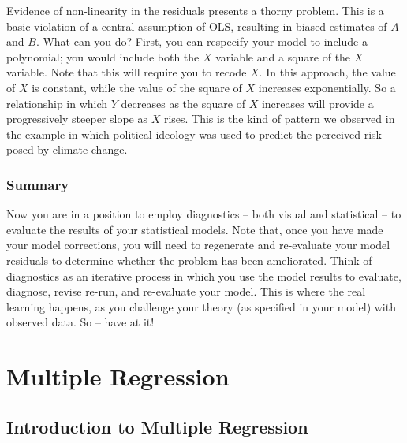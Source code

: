 \documentclass[11pt,openany]{book}\usepackage[]{graphicx}\usepackage[]{color}
\begin{document}
Evidence of non-linearity in the residuals presents a thorny problem. This is a basic violation of a central assumption of OLS, resulting in biased estimates of $A$ and $B$. What can you do? First, you can respecify your model to include a polynomial; you would include both the $X$ variable and a square of the $X$ variable. Note that this will require you to recode $X$. In this approach, the value of $X$ is constant, while the value of the square of $X$ increases exponentially. So a relationship in which $Y$ decreases as the square of $X$ increases will provide a progressively steeper slope as $X$ rises. This is the kind of pattern we observed in the example in which political ideology was used to predict the perceived risk posed by climate change.

\section{Summary} 

Now you are in a position to employ diagnostics -- both visual and statistical -- to evaluate the results of your statistical models. Note that, once you have made your model corrections, you will need to regenerate and re-evaluate your model residuals to determine whether the problem has been ameliorated. Think of diagnostics as an iterative process in which you use the model results to evaluate, diagnose, revise re-run, and re-evaluate your model. This is where the real learning happens, as you challenge your theory (as specified in your model) with observed data. So -- have at it!

\part{Multiple Regression} 




\chapter{Introduction to Multiple Regression}
\end{document}
